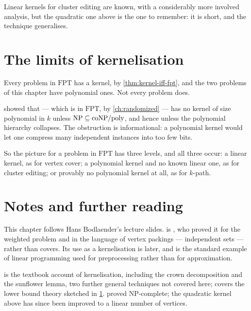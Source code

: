 Linear kernels for cluster editing are known, with a considerably more involved
analysis, but the quadratic one above is the one to remember: it is short, and
the technique generalises.

\section{The limits of kernelisation}
\label{sec:kernel-limits}

Every problem in $\mathrm{FPT}$ has a kernel, by
\cref{thm:kernel-iff-fpt}, and the two problems of this chapter have polynomial
ones. Not every problem does.

 showed that  --- which is in
$\mathrm{FPT}$, by \cref{ch:randomized} --- has no kernel of size polynomial in
$k$ unless $\mathrm{NP} \subseteq \mathrm{coNP}/\mathrm{poly}$, and hence unless the
polynomial hierarchy collapses. The obstruction is informational: a polynomial
kernel would let one compress many independent instances into too few bits.

So the picture for a problem in $\mathrm{FPT}$ has three levels, and all three
occur: a linear kernel, as for vertex cover; a polynomial kernel and no known
linear one, as for cluster editing; or provably no polynomial kernel at all, as
for $k$-path.

\section{Notes and further reading}
\label{sec:kernelization-further-reading}

This chapter follows Hans Bodlaender's lecture slides.
 is \citet{NemhauserTrotter1975}, who proved it for
the weighted problem and in the language of vertex packings --- independent sets
--- rather than covers. Its use as a kernelisation is later, and is the standard
example of linear programming used for preprocessing rather than for
approximation.

\citet[Chapter~2]{CyganEtAl2015} is the textbook account of kernelisation,
including the crown decomposition and the sunflower lemma, two further general
techniques not covered here; \citet[Chapter~15]{CyganEtAl2015} covers the lower
bound theory sketched in \cref{sec:kernel-limits}.
\citet{ShamirSharanTsur2002} proved  \textrm{NP}-complete;
the quadratic kernel above has since been improved to a linear number of
vertices.

